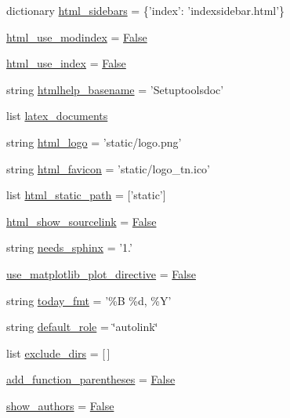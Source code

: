 \begin{DoxyCompactItemize}
dictionary \hyperlink{namespaceconf_a851a997495677617858e78bff00d6c6e}{html\+\_\+sidebars} = \{'index'\+: 'indexsidebar.\+html'\}
\item 
\hyperlink{namespaceconf_a8662adb4015249c70d8a12e9a5f258c8}{html\+\_\+use\+\_\+modindex} = \hyperlink{libqhull_8h_a306ebd41c0cd1303b1372c6153f0caf8}{False}
\item 
\hyperlink{namespaceconf_af06bd0927581dbe55f99799545d18bd6}{html\+\_\+use\+\_\+index} = \hyperlink{libqhull_8h_a306ebd41c0cd1303b1372c6153f0caf8}{False}
\item 
string \hyperlink{namespaceconf_a74d707b34bba474e9057f383ad01de83}{htmlhelp\+\_\+basename} = 'Setuptoolsdoc'
\item 
list \hyperlink{namespaceconf_a00b7896473527f894006130b1113cb4b}{latex\+\_\+documents}
\item 
string \hyperlink{namespaceconf_a5c9fb4f5f81fbe64d03716f0dd7ff3cb}{html\+\_\+logo} = 'static/logo.\+png'
\item 
string \hyperlink{namespaceconf_ac2a0566788a90720ba8d852f67eeda76}{html\+\_\+favicon} = 'static/logo\+\_\+tn.\+ico'
\item 
list \hyperlink{namespaceconf_acb91fefcfd3aa6f3529fa682ab834832}{html\+\_\+static\+\_\+path} = \mbox{[}'static'\mbox{]}
\item 
\hyperlink{namespaceconf_addae8074fd85797596fa005bfa0a51a6}{html\+\_\+show\+\_\+sourcelink} = \hyperlink{libqhull_8h_a306ebd41c0cd1303b1372c6153f0caf8}{False}
\item 
string \hyperlink{namespaceconf_a1bd7b8b2b5162016a408465167765e68}{needs\+\_\+sphinx} = '1.'
\item 
\hyperlink{namespaceconf_a5f8d625775786514c1bd1cd7a6650d69}{use\+\_\+matplotlib\+\_\+plot\+\_\+directive} = \hyperlink{libqhull_8h_a306ebd41c0cd1303b1372c6153f0caf8}{False}
\item 
string \hyperlink{namespaceconf_a17aebe18c0db0c8d1c4017c0b563c934}{today\+\_\+fmt} = '\%B \%d, \%Y'
\item 
string \hyperlink{namespaceconf_a038ead0be6737e911aede67886fcedca}{default\+\_\+role} = \char`\"{}autolink\char`\"{}
\item 
list \hyperlink{namespaceconf_a423709e8d7f8b9c3b34e88e40550e8ba}{exclude\+\_\+dirs} = \mbox{[}$\,$\mbox{]}
\item 
\hyperlink{namespaceconf_a07e256fcb9def824191175f2baa72f60}{add\+\_\+function\+\_\+parentheses} = \hyperlink{libqhull_8h_a306ebd41c0cd1303b1372c6153f0caf8}{False}
\item 
\hyperlink{namespaceconf_a8ad36ea49cb7ae6ec9f6f3a7e9deaa0e}{show\+\_\+authors} = \hyperlink{libqhull_8h_a306ebd41c0cd1303b1372c6153f0caf8}{False}

\end{DoxyCompactItemize}
